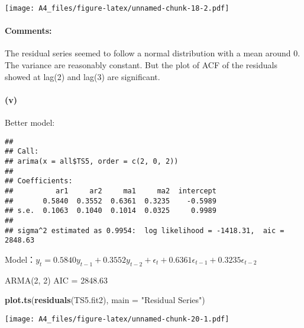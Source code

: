 \documentclass[]{article}
\newenvironment{Shaded}{\begin{snugshade}}{\end{snugshade}}
\newcommand{\CommentTok}[1]{\textcolor[rgb]{0.56,0.35,0.01}{\textit{#1}}}
\newcommand{\DataTypeTok}[1]{\textcolor[rgb]{0.13,0.29,0.53}{#1}}
\newcommand{\DecValTok}[1]{\textcolor[rgb]{0.00,0.00,0.81}{#1}}
\newcommand{\KeywordTok}[1]{\textcolor[rgb]{0.13,0.29,0.53}{\textbf{#1}}}
\newcommand{\NormalTok}[1]{#1}
\newcommand{\OperatorTok}[1]{\textcolor[rgb]{0.81,0.36,0.00}{\textbf{#1}}}
\newcommand{\StringTok}[1]{\textcolor[rgb]{0.31,0.60,0.02}{#1}}
\let\oldparagraph\paragraph
\renewcommand{\paragraph}[1]{\oldparagraph{#1}\mbox{}}
\begin{document}
\texttt{[image: A4\_files/figure-latex/unnamed-chunk-18-2.pdf]}

\hypertarget{comments-5}{%
\paragraph{Comments:}\label{comments-5}}

The residual series seemed to follow a normal distribution with a mean
around 0. The variance are reasonably constant. But the plot of ACF of
the residuals showed at lag(2) and lag(3) are significant.

\hypertarget{v-4}{%
\paragraph{(v)}\label{v-4}}

Better model:

\begin{Shaded}
\end{Shaded}

\begin{verbatim}
## 
## Call:
## arima(x = all$TS5, order = c(2, 0, 2))
## 
## Coefficients:
##          ar1     ar2     ma1     ma2  intercept
##       0.5840  0.3552  0.6361  0.3235    -0.5989
## s.e.  0.1063  0.1040  0.1014  0.0325     0.9989
## 
## sigma^2 estimated as 0.9954:  log likelihood = -1418.31,  aic = 2848.63
\end{verbatim}

Model：\(y_t = 0.5840 y_{t-1} +0.3552 y_{t-2} + \epsilon_t + 0.6361 \epsilon_{t-1} + 0.3235 \epsilon_{t-2}\)

ARMA(2, 2) AIC = 2848.63

\begin{Shaded}
\begin{Highlighting}[]
\KeywordTok{plot.ts}\NormalTok{(}\KeywordTok{residuals}\NormalTok{(TS5.fit2), }\DataTypeTok{main =} \StringTok{"Residual Series"}\NormalTok{)}
\end{Highlighting}
\end{Shaded}

\texttt{[image: A4\_files/figure-latex/unnamed-chunk-20-1.pdf]}
\end{document}
